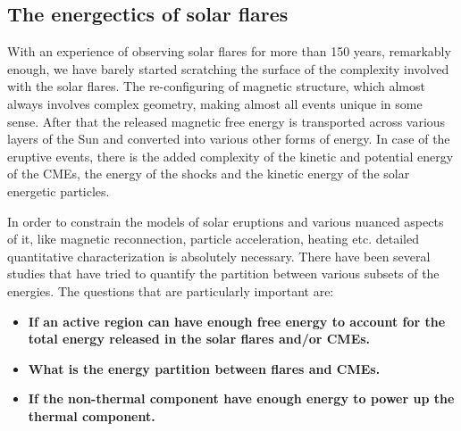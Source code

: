 \subsection{The energectics of solar flares}\label{sol_flr_energ}

With an experience of observing solar flares for more than 150 years, remarkably enough, we have barely started scratching the surface of the complexity involved with the solar flares. The re-configuring of magnetic structure, which almost always involves complex geometry, making almost all events unique in some sense. After that the released magnetic free energy is transported across various layers of the Sun and converted into various other forms of energy. In case of the eruptive events, there is the added complexity of the kinetic and potential energy of the CMEs, the energy of the shocks and the kinetic energy of the solar energetic particles.

In order to constrain the models of solar eruptions and various nuanced aspects of it, like magnetic reconnection, particle acceleration, heating etc. detailed quantitative characterization is absolutely necessary. There have been several studies that have tried to quantify the partition between various subsets of the energies. The questions that are particularly important are:

\begin{itemize}
    \item \textbf{If an active region can have enough free energy to account for the total energy released in the solar flares and/or CMEs.}
    \item \textbf{What is the energy partition between flares and CMEs.}
    \item \textbf{If the non-thermal component have enough energy to power up the thermal component.}
\end{itemize}

